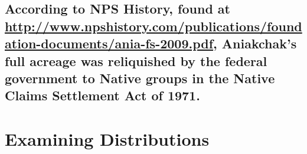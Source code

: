 \documentclass[
]{article}
\newenvironment{Shaded}{\begin{snugshade}}{\end{snugshade}}
\newcommand{\DecValTok}[1]{\textcolor[rgb]{0.00,0.00,0.81}{#1}}
\newcommand{\KeywordTok}[1]{\textcolor[rgb]{0.13,0.29,0.53}{\textbf{#1}}}
\newcommand{\NormalTok}[1]{#1}
\newcommand{\OperatorTok}[1]{\textcolor[rgb]{0.81,0.36,0.00}{\textbf{#1}}}
\newcommand{\StringTok}[1]{\textcolor[rgb]{0.31,0.60,0.02}{#1}}
\begin{document}
\begin{Shaded}
\end{Shaded}

\hypertarget{according-to-nps-history-found-at-httpwww.npshistory.compublicationsfoundation-documentsania-fs-2009.pdf-aniakchaks-full-acreage-was-reliquished-by-the-federal-government-to-native-groups-in-the-native-claims-settlement-act-of-1971.}{%
\subsection{\texorpdfstring{According to NPS History, found at
\url{http://www.npshistory.com/publications/foundation-documents/ania-fs-2009.pdf},
Aniakchak's full acreage was reliquished by the federal government to
Native groups in the Native Claims Settlement Act of
1971.}{According to NPS History, found at http://www.npshistory.com/publications/foundation-documents/ania-fs-2009.pdf, Aniakchak's full acreage was reliquished by the federal government to Native groups in the Native Claims Settlement Act of 1971.}}\label{according-to-nps-history-found-at-httpwww.npshistory.compublicationsfoundation-documentsania-fs-2009.pdf-aniakchaks-full-acreage-was-reliquished-by-the-federal-government-to-native-groups-in-the-native-claims-settlement-act-of-1971.}}

\begin{Shaded}
\end{Shaded}

\hypertarget{examining-distributions}{%
\section{Examining Distributions}\label{examining-distributions}}
\end{document}
